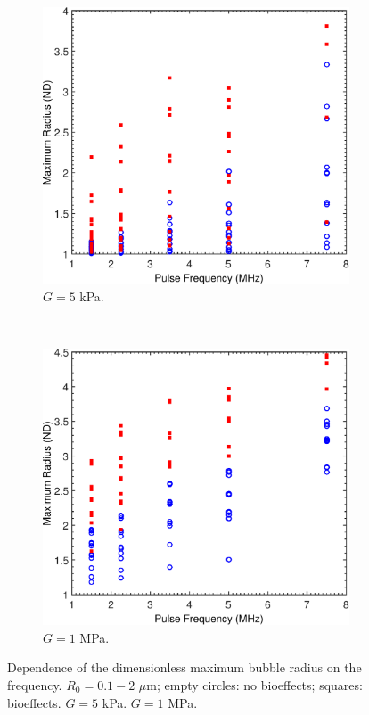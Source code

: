 \begin{figure}[t]
  \begin{subfigure}{0.47\textwidth}
    \includegraphics[width=\textwidth]{figs/bubble_figs/Rstarmax_F_Ca=20}
    \caption{$G=5$ kPa.}
  \label{fig:freq_tissue_Ca20}
  \end{subfigure}
  ~
  \begin{subfigure}{0.47\textwidth}
    \includegraphics[width=\textwidth]{figs/bubble_figs/Rstarmax_F_Ca=0,1}
    \caption{$G=1$ MPa.}
    \label{fig:freq_tissue_Ca0,1}
  \end{subfigure}
  \caption[Dependence of the dimensionless maximum bubble
    radius on the frequency.]{Dependence of the dimensionless maximum bubble
    radius on the frequency. $R_0=0.1-2$ $\mu$m; empty circles: no
    bioeffects; squares: bioeffects. 
    $G=5$ kPa.  $G=1$ MPa.}
  \label{fig:freq_tissue}
\end{figure}

